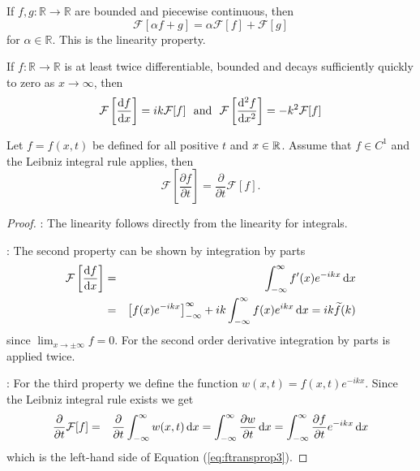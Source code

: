 \begin{theorem}
	\begin{description}[style=unboxed,leftmargin=0.4cm]
		\item[1] {
			If $f,g:\mathbb{R} \rightarrow \mathbb{R}$ are bounded and piecewise continuous, then 
			\begin{equation}
				\mathcal{F}[\alpha f + g] = \alpha \mathcal{F}[f] + \mathcal{F}[g] 
			\end{equation}
			for  $\alpha \in \mathbb{R}.$ This is the linearity property. 
		}
		\item[2] {
		If $f: \mathbb{R} \rightarrow \mathbb{R}$ is at least twice differentiable, bounded and
			decays sufficiently quickly to zero as $x \rightarrow \infty$, then   
			\begin{equation}
			\mathcal{F}\left[\frac{\mathrm{d} f}{\mathrm{d} x}\right] = ik \mathcal{F}[f] \ \ \text{and} 
			\ \ \mathcal{F}\left[\frac{\mathrm{d}^2 f}{\mathrm{d} x^2}\right] = -k^2 \mathcal{F}[f]
			\end{equation}
		}
		\item[3]{ 
		Let $f=f(x,t)$ be defined for all positive $t$ and $x\in \mathbb{R}$. Assume that $f \in C^1$ and 
		the Leibniz integral rule applies, then  
		\begin{equation}
			\label{eq:ftransprop3}
			\mathcal{F}\left[\frac{\partial f}{\partial t}\right] = \frac{\partial}{\partial t} \mathcal{F}[f].
		\end{equation}
			}
	\end{description}	
\end{theorem}

\begin{proof}
	
	\bigskip

	: The linearity follows directly from the linearity for integrals. 

	\bigskip

	: The second property can be shown by integration by parts 
	\begin{eqnarray}
		\mathcal{F}\left[\frac{\mathrm{d} f}{\mathrm{d} x}\right] &=& \int_{-\infty}^\infty f'(x) e^{-ikx} \, \mathrm{d} x  \nonumber \\
		&=& \left[f(x) e^{-ikx}\right]_{-\infty}^\infty + ik \int_{-\infty}^\infty f(x) e^{ikx}\, \mathrm{d} x = ik \widetilde{f}(k)
	\end{eqnarray}
	since $\lim_{x\rightarrow \pm \infty} f = 0$. For the second order derivative integration by
	parts is applied twice.

	\bigskip

	: For the third property we define the function $w(x,t) = f(x,t)e^{-ikx}$. Since the
	Leibniz integral rule exists we get 
	\begin{eqnarray}
		\frac{\partial}{\partial t} \mathcal{F}[f] &=& \frac{\partial}{\partial t}
		\int_{-\infty}^\infty w(x,t) \, \mathrm{d} x =  
 \int_{-\infty}^\infty \frac{\partial w}{\partial t} \, \mathrm{d} x = \int_{-\infty}^\infty \frac{\partial f}{\partial t} e^{-ik x} \, \mathrm{d} x 
	\end{eqnarray}
	which is the left-hand side of Equation (\ref{eq:ftransprop3}).	
\end{proof}

